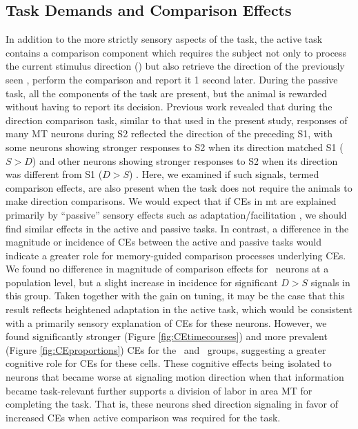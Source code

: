 \subsection*{Task Demands and Comparison Effects}
In addition to the more strictly sensory aspects of the task, the active task contains a comparison component which requires the subject not only to process the current stimulus direction (\test) but also retrieve the direction of the previously seen \sample, perform the comparison and report it 1 second later.
During the passive task, all the components of the task are present, but the animal is rewarded without having to report its decision. Previous work revealed that during the direction comparison task, similar to that used in the present study, responses of many MT neurons during S2 reflected the direction of the preceding S1, with some neurons showing stronger responses to S2 when its direction matched S1 ($S>D$) and other neurons showing stronger responses to S2 when its direction was different from S1 ($D>S$) \parencite{Lui2011}.  Here, we examined if such signals, termed comparison effects, are also present when the task does not require the animals to make direction comparisons. 
\newcommand{\revCeDiscussion}{
	We would expect that if CEs in \gls{mt} are explained primarily by ``passive'' sensory effects such as adaptation/facilitation \parencite{Kohn2003}, we should find similar effects in the active and passive tasks.\label{rev:ceLogicDis} 
	In contrast, a difference in the magnitude or incidence of CEs between the active and passive tasks would indicate a greater role for memory-guided comparison processes underlying CEs.
	We found no difference in magnitude of comparison effects for \enhanced\ neurons at a population level, but a slight increase in incidence for significant $D>S$ signals in this group. Taken together with the gain on tuning, it may be the case that this result reflects heightened adaptation in the active task, which would be consistent with a primarily sensory explanation of CEs for these neurons.
	However, we found significantly stronger (Figure \ref{fig:CEtimecourses}) and more prevalent (Figure \ref{fig:CEproportions}) CEs for the \suppressed\ and \consistent\ groups, suggesting a greater cognitive role for CEs for these cells.
}\revCeDiscussion\label{rev:ceDiscussion}
These cognitive effects being isolated to neurons that became worse at signaling motion direction when that information became task-relevant further supports a division of labor in area MT for completing the task.
That is, these neurons shed direction signaling in favor of increased CEs when active comparison was required for the task.


